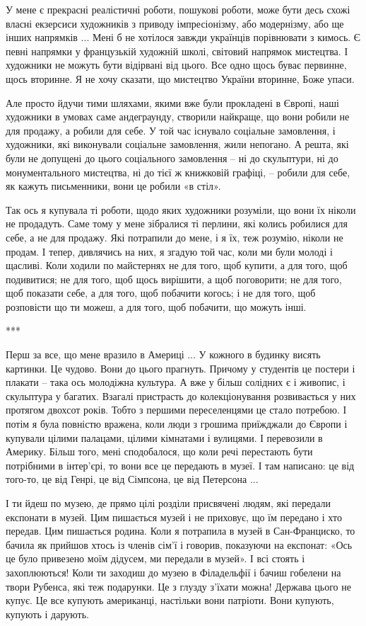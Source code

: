 У мене є прекрасні реалістичні роботи, пошукові роботи, може бути десь схожі
власні екзерсиси художників з приводу імпресіонізму, або модернізму, або ще
інших напрямків ... Мені б не хотілося завжди українців порівнювати з кимось. Є
певні напрямки у французькій художній школі, світовий напрямок мистецтва. І
художники не можуть бути відірвані від цього. Все одно щось буває первинне,
щось вторинне. Я не хочу сказати, що мистецтво України вторинне, Боже упаси.

Але просто йдучи тими шляхами, якими вже були прокладені в Європі, наші
художники в умовах саме андеграунду, створили найкраще, що вони робили не для
продажу, а робили для себе. У той час існувало соціальне замовлення, і
художники, які виконували соціальне замовлення, жили непогано. А решта, які
були не допущені до цього соціального замовлення – ні до скульптури, ні до
монументального мистецтва, ні до тієї ж книжковій графіці, – робили для себе,
як кажуть письменники, вони це робили «в стіл». 

Так ось я купувала ті роботи, щодо яких художники розуміли, що вони їх ніколи
не продадуть. Саме тому у мене зібралися ті перлини, які колись робилися для
себе, а не для продажу. Які потрапили до мене, і я їх, теж розумію, ніколи не
продам. І тепер, дивлячись на них, я згадую той час, коли ми були молоді і
щасливі. Коли ходили по майстернях не для того, щоб купити, а для того, щоб
подивитися; не для того, щоб щось вирішити, а щоб поговорити; не для того, щоб
показати себе, а для того, щоб побачити когось; і не для того, щоб розповісти
що ти можеш, а для того, щоб побачити, що можуть інші.

***

Перш за все, що мене вразило в Америці ... У кожного в будинку висять картинки.
Це чудово. Вони до цього прагнуть. Причому у студентів це постери і плакати –
така ось молодіжна культура. А вже у більш солідних є і живопис, і скульптура у
багатих. Взагалі пристрасть до колекціонування розвивається у них протягом
двохсот років. Тобто з першими переселенцями це стало потребою. І потім я була
повністю вражена, коли люди з грошима приїжджали до Європи і купували цілими
палацами, цілими кімнатами і вулицями. І перевозили в Америку. Більш того, мені
сподобалося, що коли речі перестають бути потрібними в інтер'єрі, то вони все
це передають в музеї. І там написано: це від того-то, це від Генрі, це від
Сімпсона, це від Петерсона ... 

І ти йдеш по музею, де прямо цілі розділи
присвячені людям, які передали експонати в музей. Цим пишається музей і не
приховує, що їм передано і хто передав. Цим пишається родина. Коли я потрапила
в музей в Сан-Франциско, то бачила як прийшов хтось із членів сім'ї і говорив,
показуючи на експонат: «Ось це було привезено моїм дідусем, ми передали в
музей». І всі стоять і захоплюються! Коли ти заходиш до музею в Філадельфії і
бачиш гобелени на твори Рубенса, які теж подарунки. Це з глузду з'їхати можна!
Держава цього не купує. Це все купують американці, настільки вони патріоти.
Вони купують, купують і дарують. 

